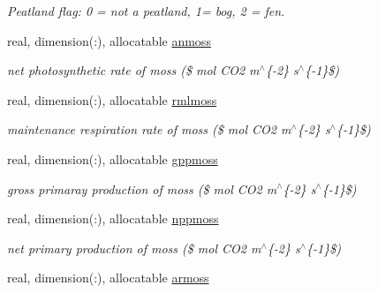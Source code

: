 \begin{DoxyCompactItemize}
\begin{DoxyCompactList}\small\item\em Peatland flag\+: 0 = not a peatland, 1= bog, 2 = fen. \end{DoxyCompactList}\item 
\hypertarget{structctem__statevars_1_1veg__gat_a09595ff6c3f40002e19a89818735c3c6}{}real, dimension(\+:), allocatable \hyperlink{structctem__statevars_1_1veg__gat_a09595ff6c3f40002e19a89818735c3c6}{anmoss}\label{structctem__statevars_1_1veg__gat_a09595ff6c3f40002e19a89818735c3c6}

\begin{DoxyCompactList}\small\item\em net photosynthetic rate of moss (\$ mol C\+O2 m$^\wedge$\{-\/2\} s$^\wedge$\{-\/1\}\$) \end{DoxyCompactList}\item 
\hypertarget{structctem__statevars_1_1veg__gat_a275201a23094afd77dfb229ad89e5fb5}{}real, dimension(\+:), allocatable \hyperlink{structctem__statevars_1_1veg__gat_a275201a23094afd77dfb229ad89e5fb5}{rmlmoss}\label{structctem__statevars_1_1veg__gat_a275201a23094afd77dfb229ad89e5fb5}

\begin{DoxyCompactList}\small\item\em maintenance respiration rate of moss (\$ mol C\+O2 m$^\wedge$\{-\/2\} s$^\wedge$\{-\/1\}\$) \end{DoxyCompactList}\item 
\hypertarget{structctem__statevars_1_1veg__gat_a36725fdf5452d19d0ef332981c03308b}{}real, dimension(\+:), allocatable \hyperlink{structctem__statevars_1_1veg__gat_a36725fdf5452d19d0ef332981c03308b}{gppmoss}\label{structctem__statevars_1_1veg__gat_a36725fdf5452d19d0ef332981c03308b}

\begin{DoxyCompactList}\small\item\em gross primaray production of moss (\$ mol C\+O2 m$^\wedge$\{-\/2\} s$^\wedge$\{-\/1\}\$) \end{DoxyCompactList}\item 
\hypertarget{structctem__statevars_1_1veg__gat_aa0546dc918fa34774425531a61c2f7bf}{}real, dimension(\+:), allocatable \hyperlink{structctem__statevars_1_1veg__gat_aa0546dc918fa34774425531a61c2f7bf}{nppmoss}\label{structctem__statevars_1_1veg__gat_aa0546dc918fa34774425531a61c2f7bf}

\begin{DoxyCompactList}\small\item\em net primary production of moss (\$ mol C\+O2 m$^\wedge$\{-\/2\} s$^\wedge$\{-\/1\}\$) \end{DoxyCompactList}\item 
\hypertarget{structctem__statevars_1_1veg__gat_a0a2e08422cb7d609b4eeb3c4520caa1a}{}real, dimension(\+:), allocatable \hyperlink{structctem__statevars_1_1veg__gat_a0a2e08422cb7d609b4eeb3c4520caa1a}{armoss}\label{structctem__statevars_1_1veg__gat_a0a2e08422cb7d609b4eeb3c4520caa1a}


\end{DoxyCompactItemize}
